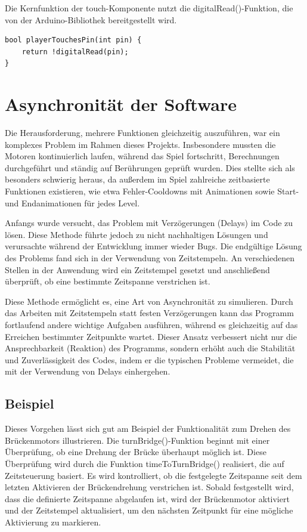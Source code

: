 Die Kernfunktion der touch-Komponente nutzt die digitalRead()-Funktion, die von der Arduino-Bibliothek bereitgestellt wird.

\begin{minipage}{\linewidth}
\begin{lstlisting}
bool playerTouchesPin(int pin) {
    return !digitalRead(pin);
}
\end{lstlisting}
\end{minipage}

\section{Asynchronität der Software}

Die Herausforderung, mehrere Funktionen gleichzeitig auszuführen, war ein komplexes Problem im Rahmen dieses Projekts. Insbesondere mussten die Motoren kontinuierlich laufen, während das Spiel fortschritt, Berechnungen durchgeführt und ständig auf Berührungen geprüft wurden.
Dies stellte sich als besonders schwierig heraus, da außerdem im Spiel zahlreiche zeitbasierte Funktionen existieren, wie etwa Fehler-Cooldowns mit Animationen sowie Start- und Endanimationen für jedes Level.

Anfangs wurde versucht, das Problem mit Verzögerungen (Delays) im Code zu lösen. Diese Methode führte jedoch zu nicht nachhaltigen Lösungen und verursachte während der Entwicklung immer wieder Bugs.
Die endgültige Lösung des Problems fand sich in der Verwendung von Zeitstempeln. An verschiedenen Stellen in der Anwendung wird ein Zeitstempel gesetzt und anschließend überprüft, ob eine bestimmte Zeitspanne verstrichen ist.

Diese Methode ermöglicht es, eine Art von Asynchronität zu simulieren. Durch das Arbeiten mit Zeitstempeln statt festen Verzögerungen kann das Programm fortlaufend andere wichtige Aufgaben ausführen, während es gleichzeitig auf das Erreichen bestimmter Zeitpunkte wartet. Dieser Ansatz verbessert nicht nur die Ansprechbarkeit (Reaktion) des Programms, sondern erhöht auch die Stabilität und Zuverlässigkeit des Codes, indem er die typischen Probleme vermeidet, die mit der Verwendung von Delays einhergehen.

\subsection{Beispiel}

Dieses Vorgehen lässt sich gut am Beispiel der Funktionalität zum Drehen des Brückenmotors illustrieren. Die turnBridge()-Funktion beginnt mit einer Überprüfung, ob eine Drehung der Brücke überhaupt möglich ist. Diese Überprüfung wird durch die Funktion timeToTurnBridge() realisiert, die auf Zeitsteuerung basiert. Es wird kontrolliert, ob die festgelegte Zeitspanne seit dem letzten Aktivieren der Brückendrehung verstrichen ist. Sobald festgestellt wird, dass die definierte Zeitspanne abgelaufen ist, wird der Brückenmotor aktiviert und der Zeitstempel aktualisiert, um den nächsten Zeitpunkt für eine mögliche Aktivierung zu markieren.

